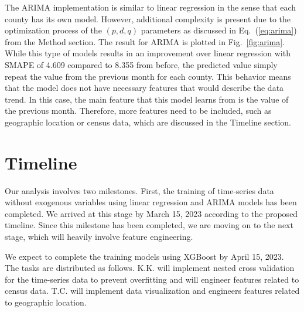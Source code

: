 \documentclass[prl,aps,superscriptaddress,twocolumn,10pt,nolongbibliography]{revtex4-2}
\begin{document}
The ARIMA implementation is similar to linear regression in the sense that each county has its own model. 
However, additional complexity is present due to the optimization process of the $(p, d, q)$ parameters as discussed in Eq.~(\ref{eq:arima}) from the Method section.
The result for ARIMA is plotted in Fig.~\ref{fig:arima}.
While this type of models results in an improvement over linear regression with SMAPE of 4.609 compared to 8.355 from before, the predicted value simply repeat the value from the previous month for each county.
This behavior means that the model does not have necessary features that would describe the data trend.
In this case, the main feature that this model learns from is the value of the previous month. 
Therefore, more features need to be included, such as geographic location or census data, which are discussed in the Timeline section.

\section{Timeline}
Our analysis involves two milestones. 
First, the training of time-series data without exogenous variables using linear regression and ARIMA models has been completed.
We arrived at this stage by March 15, 2023 according to the proposed timeline.
Since this milestone has been completed, we are moving on to the next stage, which will heavily involve feature engineering.

We expect to complete the training models using XGBoost by April 15, 2023. 
The tasks are distributed as follows. 
K.K. will implement nested cross validation for the time-series data to prevent overfitting and will engineer features related to census data.
T.C. will implement data visualization and engineers features related to geographic location.

{}
\end{document}
